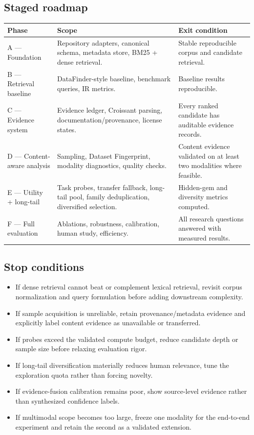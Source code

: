 \documentclass[11pt]{article}
\begin{document}
\subsection{Staged roadmap}
\begin{longtable}{@{}L{2.8cm}L{5.9cm}L{4.9cm}@{}}
\toprule
\textbf{Phase} & \textbf{Scope} & \textbf{Exit condition} \\
\midrule
\endhead
A --- Foundation & Repository adapters, canonical schema, metadata store, BM25 + dense retrieval. & Stable
  reproducible corpus and candidate retrieval. \\
B --- Retrieval baseline & DataFinder-style baseline, benchmark queries, IR metrics. & Baseline results
  reproducible. \\
C --- Evidence system & Evidence ledger, Croissant parsing, documentation/provenance, license states. &
  Every ranked candidate has auditable evidence records. \\
D --- Content-aware analysis & Sampling, Dataset Fingerprint, modality diagnostics, quality checks. &
  Content evidence validated on at least two modalities where feasible. \\
E --- Utility + long-tail & Task probes, transfer fallback, long-tail pool, family deduplication,
  diversified selection. & Hidden-gem and diversity metrics computed. \\
F --- Full evaluation & Ablations, robustness, calibration, human study, efficiency. & All research
  questions answered with measured results. \\
\bottomrule
\end{longtable}

\subsection{Stop conditions}
\begin{itemize}[leftmargin=*]
\item If dense retrieval cannot beat or complement lexical retrieval, revisit corpus normalization and
      query formulation before adding downstream complexity.
\item If sample acquisition is unreliable, retain provenance/metadata evidence and explicitly label content
      evidence as unavailable or transferred.
\item If probes exceed the validated compute budget, reduce candidate depth or sample size before relaxing
      evaluation rigor.
\item If long-tail diversification materially reduces human relevance, tune the exploration quota rather
      than forcing novelty.
\item If evidence-fusion calibration remains poor, show source-level evidence rather than synthesized
      confidence labels.
\item If multimodal scope becomes too large, freeze one modality for the end-to-end experiment and retain
      the second as a validated extension.
\end{itemize}
\end{document}
